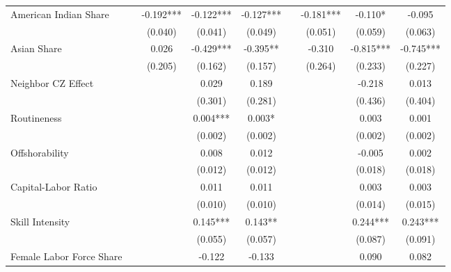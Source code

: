 \begin{table}[htbp]
\begin{tabular}{l*{8}{c}}
\addlinespace
American Indian Share&            &   -0.192***&   -0.122***&   -0.127***&            &   -0.181***&   -0.110*  &   -0.095   \\
                    &            &  (0.040)   &  (0.041)   &  (0.049)   &            &  (0.051)   &  (0.059)   &  (0.063)   \\
\addlinespace
Asian Share         &            &    0.026   &   -0.429***&   -0.395** &            &   -0.310   &   -0.815***&   -0.745***\\
                    &            &  (0.205)   &  (0.162)   &  (0.157)   &            &  (0.264)   &  (0.233)   &  (0.227)   \\
\addlinespace
Neighbor CZ Effect  &            &            &    0.029   &    0.189   &            &            &   -0.218   &    0.013   \\
                    &            &            &  (0.301)   &  (0.281)   &            &            &  (0.436)   &  (0.404)   \\
\addlinespace
Routineness         &            &            &    0.004***&    0.003*  &            &            &    0.003   &    0.001   \\
                    &            &            &  (0.002)   &  (0.002)   &            &            &  (0.002)   &  (0.002)   \\
\addlinespace
Offshorability      &            &            &    0.008   &    0.012   &            &            &   -0.005   &    0.002   \\
                    &            &            &  (0.012)   &  (0.012)   &            &            &  (0.018)   &  (0.018)   \\
\addlinespace
Capital-Labor Ratio &            &            &    0.011   &    0.011   &            &            &    0.003   &    0.003   \\
                    &            &            &  (0.010)   &  (0.010)   &            &            &  (0.014)   &  (0.015)   \\
\addlinespace
Skill Intensity     &            &            &    0.145***&    0.143** &            &            &    0.244***&    0.243***\\
                    &            &            &  (0.055)   &  (0.057)   &            &            &  (0.087)   &  (0.091)   \\
\addlinespace
Female Labor Force Share&            &            &   -0.122   &   -0.133   &            &            &    0.090   &    0.082   \\

\end{tabular}
\end{table}
